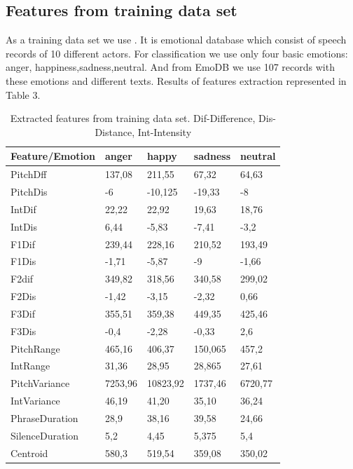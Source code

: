 \documentclass[12pt, letterpaper]{article}
\begin{document}
\subsection{Features from training data set}

As a training data set we use \cite{emodb}. It is emotional database which consist of speech records of 10 different actors. For classification we use only four basic emotions: anger, happiness,sadness,neutral. And from EmoDB we use 107 records with these emotions and different texts. Results of features extraction represented in Table 3.
\begin{table}[h]
	\centering
		\begin{tabular}{l|l|l|l|l|}
			\hline
				Feature/Emotion& anger&	happy	&sadness	&neutral\\ \hline
PitchDff&	137,08	&211,55	&67,32	&64,63\\ \hline 
PitchDis&	-6	&-10,125&	-19,33&	-8\\ \hline
IntDif&	22,22&	22,92&	19,63&	18,76\\ \hline
IntDis	&6,44	&-5,83&	-7,41&	-3,2\\ \hline
F1Dif&	239,44&	228,16&	210,52&	193,49\\ \hline
F1Dis&	-1,71	&-5,87&	-9&	-1,66\\ \hline
F2dif	&349,82&	318,56&	340,58&	299,02\\ \hline
F2Dis&	-1,42&	-3,15&	-2,32	&0,66\\ \hline
F3Dif&	355,51&	359,38&	449,35&	425,46\\ \hline
F3Dis&	-0,4	&-2,28&	-0,33&	2,6\\ \hline
PitchRange&	465,16&	406,37&	150,065&	457,2\\ \hline
IntRange&	31,36&	28,95&	28,865&	27,61\\ \hline
PitchVariance&	7253,96&	10823,92&	1737,46&	6720,77\\ \hline
IntVariance	&46,19&	41,20&	35,10	&36,24\\ \hline
PhraseDuration&	28,9&	38,16&	39,58	&24,66\\ \hline
SilenceDuration	&5,2	&4,45	&5,375&	5,4\\ \hline
Centroid&	580,3	&519,54&	359,08&	350,02\\ \hline
 \hline
		\end{tabular}
	\caption{Extracted features from training data set. Dif-Difference, Dis-Distance, Int-Intensity}
	\label{tab:ExtractedFeaturesFromTrainingDataSet}
\end{table}
\end{document}
